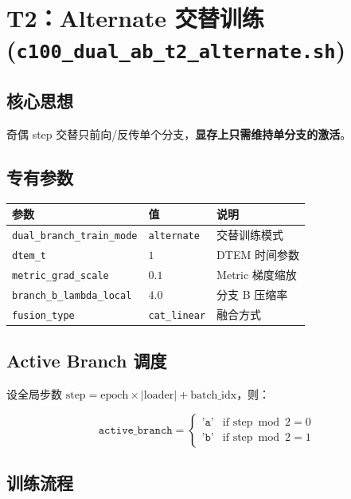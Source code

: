 \documentclass[a4paper,11pt]{article}
\begin{document}
\section{T2：Alternate 交替训练 (\texttt{c100\_dual\_ab\_t2\_alternate.sh})}

\subsection{核心思想}

奇偶 step 交替只前向/反传单个分支，\textbf{显存上只需维持单分支的激活}。

\subsection{专有参数}

\begin{table}[h]
\centering
\begin{tabular}{l l l}
\toprule
\textbf{参数} & \textbf{值} & \textbf{说明} \\
\midrule
\texttt{dual\_branch\_train\_mode} & \texttt{alternate} & 交替训练模式 \\
\texttt{dtem\_t} & $1$ & DTEM 时间参数 \\
\texttt{metric\_grad\_scale} & $0.1$ & Metric 梯度缩放 \\
\texttt{branch\_b\_lambda\_local} & $4.0$ & 分支 B 压缩率 \\
\texttt{fusion\_type} & \texttt{cat\_linear} & 融合方式 \\
\bottomrule
\end{tabular}
\end{table}

\subsection{Active Branch 调度}

设全局步数 $\text{step} = \text{epoch} \times |\text{loader}| + \text{batch\_idx}$，则：

\[
    \texttt{active\_branch} = \begin{cases}
        \texttt{'a'} & \text{if } \text{step} \bmod 2 = 0 \\
        \texttt{'b'} & \text{if } \text{step} \bmod 2 = 1
    \end{cases}
\]

\subsection{训练流程}
\end{document}
